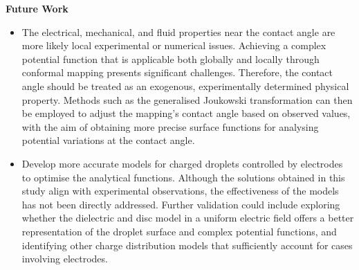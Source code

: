 \noindent\textbf{Future Work}
\begin{itemize}
    \item The electrical, mechanical, and fluid properties near the contact angle are more likely local experimental or numerical issues. Achieving a complex potential function that is applicable both globally and locally through conformal mapping presents significant challenges. Therefore, the contact angle should be treated as an exogenous, experimentally determined physical property. Methods such as the generalised Joukowski transformation can then be employed to adjust the mapping's contact angle based on observed values, with the aim of obtaining more precise surface functions for analysing potential variations at the contact angle.


    \item Develop more accurate models for charged droplets controlled by electrodes to optimise the analytical functions. Although the solutions obtained in this study align with experimental observations, the effectiveness of the models has not been directly addressed. Further validation could include exploring whether the dielectric and disc model in a uniform electric field offers a better representation of the droplet surface and complex potential functions, and identifying other charge distribution models that sufficiently account for cases involving electrodes.

\end{itemize}



\pagebreak
